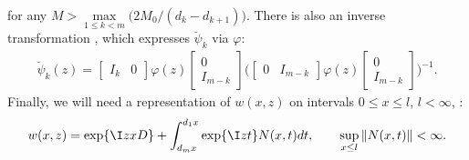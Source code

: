 for any $M>\max\limits_{1\leq k<m}\big(2M_0/(d_k-d_{k+1})\big)$. There is also an inverse transformation \cite[Remark~4.6]{SaSaR}, which expresses $\breve \psi_k$ via $\varphi$:
\begin{gather}
  \breve\psi_k^{\,} (z)
= \begin{bmatrix} I_k & 0\end{bmatrix}
 \varphi (z)
 \left[
  \begin{matrix}
    0  \\
    I_{m-k}
  \end{matrix}
 \right]
 \biggl(
 \begin{bmatrix} 0 & I_{m-k}\end{bmatrix}
  \varphi (z)
  \left[
  \begin{matrix}
    0  \\
    I_{m-k}
  \end{matrix}
  \right]
 \biggr)^{-1} .
 \label{NW17}
\end{gather}
Finally, we will need a representation of $w(x,z)$ on intervals $0\leq x\leq l$, $l<\infty$, \cite[equation~(4.37)]{SaSaR} :
\begin{gather}
  w(x,z) = \exp \{ \I z x D\}
    + \int_{d_m x}^{d_1 x}
           \exp \{\I zt\}
     N(x,t)
     dt, \qquad \sup_{x\leq l} \| N(x,t) \| < \infty.
 \label{NW18}
\end{gather}

